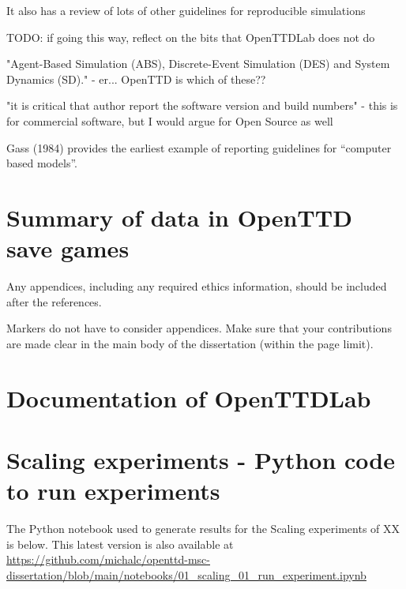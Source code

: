 \documentclass[logo,msc,dsti]{infthesis}    %
\begin{document}
\begin{itemize}
\begin{itemize}
\begin{item}
It also has a review of lots of other guidelines for reproducible simulations

TODO: if going this way, reflect on the bits that OpenTTDLab does not do

"Agent-Based Simulation (ABS), Discrete-Event Simulation (DES) and System Dynamics (SD)." - er... OpenTTD is which of these??

"it is critical that author report the software version and build numbers" - this is for commercial software, but I would argue for Open Source as well
\end{item}

\begin{item}
Gass (1984) provides the earliest example of reporting guidelines for “computer based models”.
\end{item}
\end{itemize}

\end{itemize}






\appendix

\chapter{Summary of data in OpenTTD save games}


Any appendices, including any required ethics information, should be included
after the references.

Markers do not have to consider appendices. Make sure that your contributions
are made clear in the main body of the dissertation (within the page limit).

\chapter{Documentation of OpenTTDLab}



\chapter{Scaling experiments - Python code to run experiments}
\label{chapter:scaling-running-code}

The Python notebook used to generate results for the Scaling experiments of XX is below. This latest version is also available at \url{https://github.com/michalc/openttd-msc-dissertation/blob/main/notebooks/01_scaling_01_run_experiment.ipynb}
\end{document}
